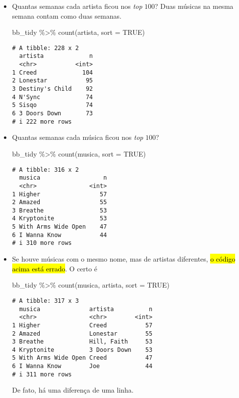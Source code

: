 \documentclass[
  letterpaper,
  DIV=11,
  numbers=noendperiod]{scrreprt}
\newenvironment{Shaded}{\begin{snugshade}}{\end{snugshade}}
\newcommand{\AttributeTok}[1]{\textcolor[rgb]{0.40,0.45,0.13}{#1}}
\newcommand{\ConstantTok}[1]{\textcolor[rgb]{0.56,0.35,0.01}{#1}}
\newcommand{\FunctionTok}[1]{\textcolor[rgb]{0.28,0.35,0.67}{#1}}
\newcommand{\NormalTok}[1]{\textcolor[rgb]{0.00,0.23,0.31}{#1}}
\newcommand{\SpecialCharTok}[1]{\textcolor[rgb]{0.37,0.37,0.37}{#1}}
\begin{document}
\begin{itemize}
\item
  Quantas semanas cada artista ficou nos \emph{top} $100$? Duas músicas
  na mesma semana contam como duas semanas.

\begin{Shaded}
\begin{Highlighting}[]
\NormalTok{bb\_tidy }\SpecialCharTok{\%\textgreater{}\%} 
  \FunctionTok{count}\NormalTok{(artista, }\AttributeTok{sort =} \ConstantTok{TRUE}\NormalTok{)}
\end{Highlighting}
\end{Shaded}

\begin{verbatim}
# A tibble: 228 x 2
  artista             n
  <chr>           <int>
1 Creed             104
2 Lonestar           95
3 Destiny's Child    92
4 N'Sync             74
5 Sisqo              74
6 3 Doors Down       73
# i 222 more rows
\end{verbatim}
\item
  Quantas semanas cada música ficou nos \emph{top} $100$?

\begin{Shaded}
\begin{Highlighting}[]
\NormalTok{bb\_tidy }\SpecialCharTok{\%\textgreater{}\%} 
  \FunctionTok{count}\NormalTok{(musica, }\AttributeTok{sort =} \ConstantTok{TRUE}\NormalTok{)}
\end{Highlighting}
\end{Shaded}

\begin{verbatim}
# A tibble: 316 x 2
  musica                  n
  <chr>               <int>
1 Higher                 57
2 Amazed                 55
3 Breathe                53
4 Kryptonite             53
5 With Arms Wide Open    47
6 I Wanna Know           44
# i 310 more rows
\end{verbatim}
\item
  Se houve músicas com o mesmo nome, mas de artistas diferentes, {\hl{o
  código acima está errado}}. O certo é

\begin{Shaded}
\begin{Highlighting}[]
\NormalTok{bb\_tidy }\SpecialCharTok{\%\textgreater{}\%} 
  \FunctionTok{count}\NormalTok{(musica, artista, }\AttributeTok{sort =} \ConstantTok{TRUE}\NormalTok{)}
\end{Highlighting}
\end{Shaded}

\begin{verbatim}
# A tibble: 317 x 3
  musica              artista          n
  <chr>               <chr>        <int>
1 Higher              Creed           57
2 Amazed              Lonestar        55
3 Breathe             Hill, Faith     53
4 Kryptonite          3 Doors Down    53
5 With Arms Wide Open Creed           47
6 I Wanna Know        Joe             44
# i 311 more rows
\end{verbatim}

  De fato, há uma diferença de uma linha.
\end{itemize}
\end{document}
